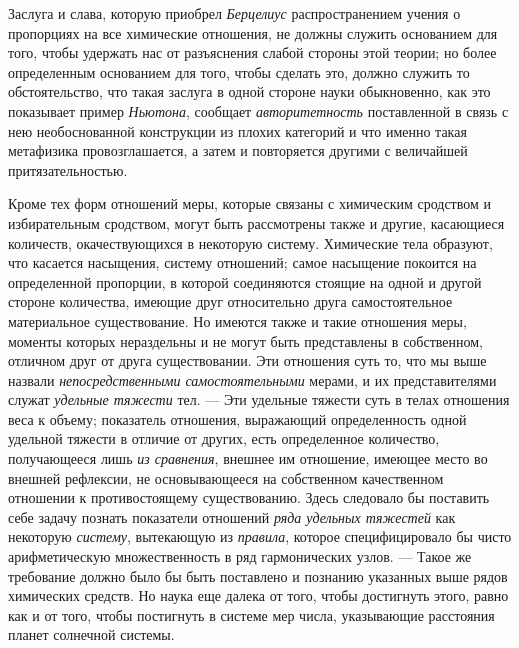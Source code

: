 Заслуга и слава, которую приобрел {\em Берцелиус}
распространением учения о пропорциях на все химические отношения, не должны
служить основанием для того, чтобы удержать нас от разъяснения слабой
стороны этой теории; но более определенным основанием для того, чтобы
сделать это, должно служить то обстоятельство, что такая заслуга в одной
стороне науки обыкновенно, как это показывает пример
{\em Ньютона}, сообщает
{\em авторитетность} поставленной в связь с нею
необоснованной конструкции из плохих категорий и что именно такая
метафизика провозглашается, а затем и повторяется другими с величайшей
притязательностью.

Кроме тех форм отношений меры, которые связаны с химическим сродством и
избирательным сродством, могут быть рассмотрены также и другие, касающиеся
количеств, окачествующихся в некоторую систему. Химические тела образуют,
что касается насыщения, систему отношений; самое насыщение покоится на
определенной пропорции, в которой соединяются стоящие на одной и другой
стороне количества, имеющие друг относительно друга самостоятельное
материальное существование. Но имеются также и такие отношения меры,
моменты которых нераздельны и не могут быть представлены в собственном,
отличном друг от друга существовании. Эти отношения суть то, что мы выше
назвали {\em непосредственными самостоятельными}
мерами, и их представителями служат {\em удельные
тяжести} тел. — Эти удельные тяжести суть в телах отношения веса к объему;
показатель отношения, выражающий определенность одной удельной тяжести в
отличие от других, есть определенное количество, получающееся лишь
{\em из сравнения}, внешнее им отношение, имеющее место
во внешней рефлексии, не основывающееся на собственном качественном
отношении к противостоящему существованию. Здесь следовало бы поставить
себе задачу познать показатели отношений {\em ряда
удельных тяжестей} как некоторую {\em систему},
вытекающую из {\em правила}, которое специфицировало бы
чисто арифметическую множественность в ряд гармонических узлов. — Такое же
требование должно было бы быть поставлено и познанию указанных выше рядов
химических средств. Но наука еще далека от того, чтобы достигнуть этого,
равно как и от того, чтобы постигнуть в системе мер числа, указывающие
расстояния планет солнечной системы.

